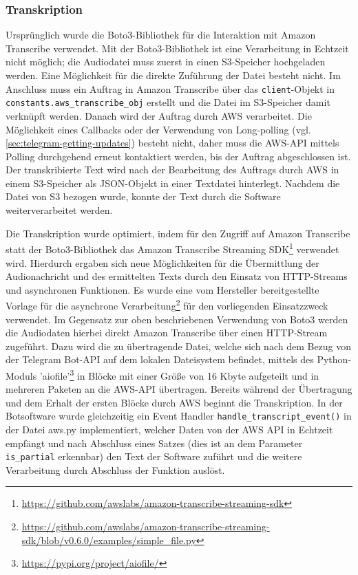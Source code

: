 \subsubsection{Transkription}
\label{sec:optimierung-transk}

Ursprünglich wurde die Boto3-Bibliothek für die Interaktion mit Amazon Transcribe verwendet. Mit der Boto3-Bibliothek ist eine Verarbeitung in Echtzeit nicht möglich; die Audiodatei muss zuerst in einen S3-Speicher hochgeladen werden. Eine Möglichkeit für die direkte Zuführung der Datei besteht nicht. Im Anschluss muss ein Auftrag in Amazon Transcribe über das \lstinline{client}-Objekt in \lstinline{constants.aws_transcribe_obj} erstellt und die Datei im S3-Speicher damit verknüpft werden. Danach wird der Auftrag durch AWS verarbeitet. Die Möglichkeit eines Callbacks oder der Verwendung von Long-polling (vgl. \autoref{sec:telegram-getting-updates}) besteht nicht, daher muss die AWS-API mittels Polling durchgehend erneut kontaktiert werden, bis der Auftrag abgeschlossen ist. Der transkribierte Text wird nach der Bearbeitung des Auftrags durch AWS in einem S3-Speicher als JSON-Objekt in einer Textdatei hinterlegt. Nachdem die Datei von S3 bezogen wurde, konnte der Text durch die Software weiterverarbeitet werden.

Die Transkription wurde optimiert, indem für den Zugriff auf Amazon Transcribe statt der Boto3-Bibliothek das Amazon Transcribe Streaming SDK\footnote{\url{https://github.com/awslabs/amazon-transcribe-streaming-sdk}} verwendet wird. Hierdurch ergaben sich neue Möglichkeiten für die Übermittlung der Audionachricht und des ermittelten Texts durch den Einsatz von HTTP-Streams und asynchronen Funktionen. Es wurde eine vom Hersteller bereitgestellte Vorlage für die asynchrone Verarbeitung\footnote{\url{https://github.com/awslabs/amazon-transcribe-streaming-sdk/blob/v0.6.0/examples/simple\_file.py}} für den vorliegenden Einsatzzweck verwendet. Im Gegensatz zur oben beschriebenen Verwendung von Boto3 werden die Audiodaten hierbei direkt Amazon Transcribe über einen HTTP-Stream zugeführt. Dazu wird die zu übertragende Datei, welche sich nach dem Bezug von der Telegram Bot-API auf dem lokalen Dateisystem befindet, mittels des Python-Moduls 'aiofile'\footnote{\url{https://pypi.org/project/aiofile/}} in Blöcke mit einer Größe von 16 Kbyte aufgeteilt und in mehreren Paketen an die AWS-API übertragen. Bereits während der Übertragung und dem Erhalt der ersten Blöcke durch AWS beginnt die Transkription. In der Botsoftware wurde gleichzeitig ein Event Handler \lstinline{handle_transcript_event()} in der Datei aws.py implementiert, welcher Daten von der AWS API in Echtzeit empfängt und nach Abschluss eines Satzes (dies ist an dem Parameter \lstinline{is_partial} erkennbar) den Text der Software zuführt und die weitere Verarbeitung durch Abschluss der Funktion auslöst.

